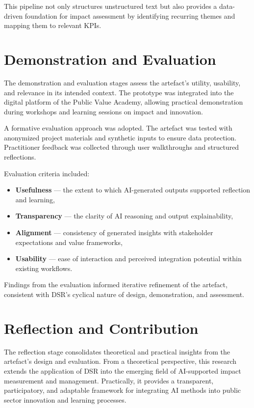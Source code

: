 This pipeline not only structures unstructured text but also provides a data-driven foundation for impact assessment by identifying recurring themes and mapping them to relevant KPIs.




\section{Demonstration and Evaluation}\label{sec:demonstration-evaluation}

The demonstration and evaluation stages assess the artefact’s utility, usability, and relevance in its intended context.
The prototype was integrated into the digital platform of the Public Value Academy, allowing practical demonstration during workshops and learning sessions on impact and innovation.

A formative evaluation approach was adopted.
The artefact was tested with anonymized project materials and synthetic inputs to ensure data protection.
Practitioner feedback was collected through user walkthroughs and structured reflections.

Evaluation criteria included:
\begin{itemize}
    \item \textbf{Usefulness} — the extent to which AI-generated outputs supported reflection and learning,
    \item \textbf{Transparency} — the clarity of AI reasoning and output explainability,
    \item \textbf{Alignment} — consistency of generated insights with stakeholder expectations and value frameworks,
    \item \textbf{Usability} — ease of interaction and perceived integration potential within existing workflows.
\end{itemize}

Findings from the evaluation informed iterative refinement of the artefact, consistent with DSR’s cyclical nature of design, demonstration, and assessment.


\section{Reflection and Contribution}\label{sec:reflection-contribution}

The reflection stage consolidates theoretical and practical insights from the artefact’s design and evaluation.
From a theoretical perspective, this research extends the application of DSR into the emerging field of AI-supported impact measurement and management.
Practically, it provides a transparent, participatory, and adaptable framework for integrating AI methods into public sector innovation and learning processes.

